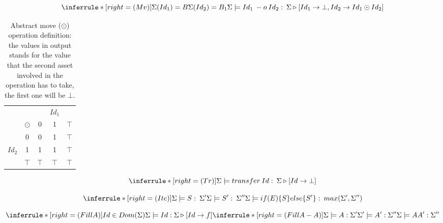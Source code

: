 \documentclass[11pt]{article} %
\begin{document}
\medskip

\[
\inferrule*[right=(Mv)]
{\Sigma(Id_1)= B \\ \Sigma(Id_2) =B_1  }
{\Sigma \models Id_1 \: -o \: Id_2 : \: \Sigma \triangleright [Id_1 \rightarrow \bot, Id_2 \rightarrow Id_1 \odot Id_2]}
\]

\medskip

\begin{table}[]
\begin{center}
\begin{tabular}{cc|ccc}
&          &     & $Id_1$ &       \\
&$ \odot $ & 0   & 1   & $\top$ \\ \hline
&0                    & 0   & 1   & $\top$                 \\
$Id_2$ &1                    & 1   & 1   & $\top$                \\ 
&$\top$ & $\top$ & $\top$ & $\top$             
\end{tabular}
\caption{Abstract move ($\odot$) operation definition: the values in output stands for the value that the second asset involved in the operation has to take, the first one will be $\bot$.}
\label{tab:abstMove}
\end{center}
\end{table}

\medskip

\[
\inferrule*[right=(Tr)]
{\\}
{\Sigma \models transfer \: Id : \: \Sigma \triangleright [Id\rightarrow \bot]}
\]

\medskip

\[
\inferrule*[right=(Ite)]
{\Sigma \models S : \: \Sigma' \\ \Sigma \models S': \: \Sigma''}
{\Sigma \models if (E) \{ S\} else\{S' \} : \: max(\Sigma',\Sigma'')}
\]

\medskip

\[
\inferrule*[right=(FillA)]
{Id \in Dom(\Sigma)}
{\Sigma \models Id : \Sigma \triangleright [Id\rightarrow f]}
\inferrule*[right=(FillA-A)]
{\Sigma \models A : \Sigma' \\ \Sigma'\models A':\Sigma'' }
{\Sigma \models A A' : \Sigma''}
\]

\medskip
\end{document}
